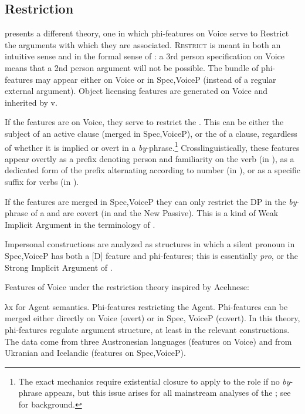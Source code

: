 \begin{exe}
\begin{xlist}
\begin{xlist}
\begin{xlist}
\begin{xlist}
\begin{xlist}
\begin{xlist}
\begin{exe}
\begin{xlist}
\begin{exe}
\begin{exe}
\begin{xlist}
\begin{exe}
\begin{exe}
\begin{xlist}
\begin{exe}
\begin{xlist}
\begin{exe}
\begin{xlist}
\begin{exe}
\begin{xlist}
\begin{exe}
\begin{xlist}
\begin{exe}
\begin{xlist}
	\subsection{Restriction}
\cite{legate12lang,legate14} presents a different theory, one in which phi-features on Voice serve to Restrict the arguments with which they are associated. \textsc{Restrict} is meant in both an intuitive sense and in the formal sense of \cite{chungladusaw04}: a 3rd person specification on Voice means that a 2nd person argument will not be possible. The bundle of phi-features may appear either on Voice or in Spec,VoiceP (instead of a regular external argument). Object licensing features are generated on Voice and inherited by v.

If the features are on Voice, they serve to restrict the . This can be either the subject of an active clause (merged in Spec,VoiceP), or the  of a  clause, regardless of whether it is implied or overt in a \emph{by}-phrase.\footnote{The exact mechanics require existential closure to apply to the  role if no \emph{by}-phrase appears, but this issue arises for all mainstream analyses of the ; see \cite{williams15} for background.} Crosslinguistically, these features appear overtly as a prefix denoting person and familiarity on the verb (in ), as a dedicated form of the  prefix alternating according to number (in ), or as a specific suffix for   verbs (in ).

If the features are merged in Spec,VoiceP they can only restrict the DP in the \emph{by}-phrase of a  and are covert (in  and the  New Passive). This is a kind of Weak Implicit Argument in the terminology of \cite{landau10}.

Impersonal constructions are analyzed as structures in which a silent pronoun in Spec,VoiceP has both a [D] feature and phi-features; this is essentially \textit{pro}, or the Strong Implicit Argument of \cite{landau10}.
 \begin{exe}
 \ex  Features of Voice under the restriction theory inspired by Acehnese: 
 \begin{xlist} 
 	\ex  λx for Agent semantics. 
 	\ex  Phi-features restricting the Agent. 
 	\ex  Phi-features can be merged either directly on Voice (overt) or in Spec, VoiceP (covert). 
 \z
\z 
In this theory, phi-features regulate argument structure, at least in the relevant constructions. The data come from three Austronesian languages (features on Voice) and from Ukranian and Icelandic (features on Spec,VoiceP).


\end{xlist}
\end{exe}
\end{xlist}
\end{exe}
\end{xlist}
\end{exe}
\end{xlist}
\end{exe}
\end{xlist}
\end{exe}
\end{xlist}
\end{exe}
\end{xlist}
\end{exe}
\end{exe}
\end{xlist}
\end{exe}
\end{exe}
\end{xlist}
\end{exe}
\end{xlist}
\end{xlist}
\end{xlist}
\end{xlist}
\end{xlist}
\end{xlist}
\end{exe}
